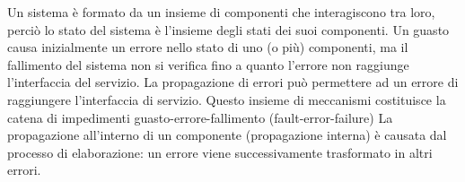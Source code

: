 \documentclass[14pt]{extarticle}
\begin{document}

Un sistema è formato da un insieme di componenti che interagiscono tra
loro, perciò lo stato del sistema è l’insieme degli stati dei suoi componenti. Un
guasto causa inizialmente un errore nello stato di uno (o più) componenti, ma
il fallimento del sistema non si verifica fino a quanto l’errore non raggiunge l’interfaccia del servizio. La propagazione di errori può permettere ad un errore
di raggiungere l’interfaccia di servizio. Questo insieme di meccanismi costituisce la catena di impedimenti guasto-errore-fallimento (fault-error-failure)
La propagazione all’interno di un componente (propagazione interna) è
causata dal processo di elaborazione: un errore viene successivamente trasformato in altri errori.
\end{document}
